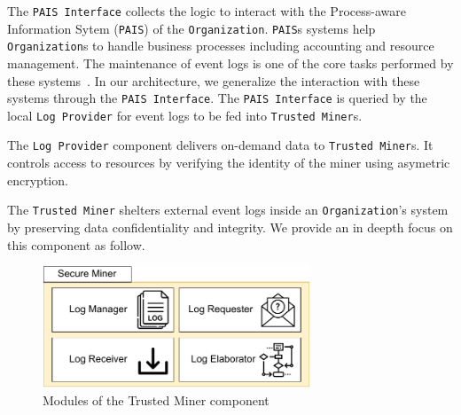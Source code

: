 The \texttt{PAIS Interface} collects the logic to interact with the Process-aware Information Sytem (\texttt{PAIS}) of the \texttt{Organization}. \texttt{PAIS}s systems help \texttt{Organization}s to handle business processes including accounting and resource management. The maintenance of event logs is one of the core tasks performed by these systems~\cite{Dumas.etal/2018:FundamentalsofBPM}. In our architecture, we generalize the interaction with these systems through the \texttt{PAIS Interface}. The \texttt{PAIS Interface} is queried by the local \texttt{Log Provider} for event logs to be fed into \texttt{Trusted Miner}s. 


The \texttt{Log Provider} component delivers on-demand data to \texttt{Trusted Miner}s. %
It controls access to resources by verifying the identity of the miner %
using asymetric encryption. %

The \texttt{Trusted Miner} shelters external event logs inside an \texttt{Organization}'s system by preserving data confidentiality and integrity. We provide an in deepth focus on this component as follow.

\begin{figure}[t]
\centering
\includegraphics[width=8cm]{content/figures/secure_miner.pdf}
\caption{Modules of the Trusted Miner component}
\label{fig:trusted_miner}
\end{figure}




